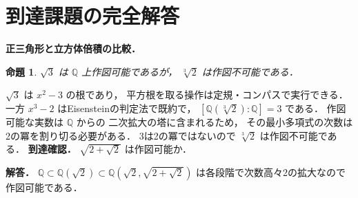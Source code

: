 \documentclass[a5paper,10pt,onecolumn]{jsarticle}
\makeatletter
\theoremstyle{mathnotetheorem}
\newtheorem{proposition}[theorem]{命題}
\renewcommand{\proofname}{証明}
\renewenvironment{proof}[1][\proofname]{%
  \par\pushQED{\qed}\normalfont\topsep4\p@\@plus2\p@\relax
  \trivlist\item[\hskip\labelsep\bfseries #1]\ignorespaces
}{\popQED\endtrivlist\@endpefalse}
\makeatother
\begin{document}
\section{到達課題の完全解答}
\noindent\textbf{正三角形と立方体倍積の比較．}
\begin{proposition}
$\sqrt3$ は $\mathbb Q$ 上作図可能であるが，
$\sqrt[3]2$ は作図不可能である．
\end{proposition}
\begin{proof}
$\sqrt3$ は $x^2-3$ の根であり，
平方根を取る操作は定規・コンパスで実行できる．
一方 $x^3-2$ はEisensteinの判定法で既約で，
$[\mathbb Q(\sqrt[3]2):\mathbb Q]=3$ である．
作図可能な実数は $\mathbb Q$ からの
二次拡大の塔に含まれるため，
その最小多項式の次数は2の冪を割り切る必要がある．
3は2の冪ではないので $\sqrt[3]2$ は作図不可能である．
\end{proof}
\noindent\textbf{到達確認．}
$\sqrt{2+\sqrt2}$ は作図可能か．
\par\noindent\textbf{解答．}
$\mathbb Q\subset\mathbb Q(\sqrt2)
\subset\mathbb Q(\sqrt2,\sqrt{2+\sqrt2})$
は各段階で次数高々2の拡大なので作図可能である．
\end{document}
